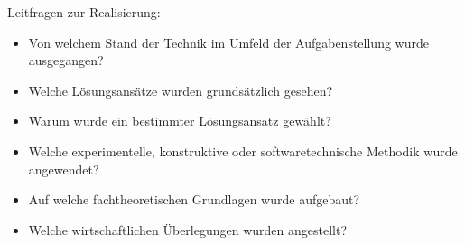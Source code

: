 \renewcommand*{\authorOfNextLines}{HTL Weiz}
Leitfragen zur Realisierung:
\begin{itemize}
	\item Von welchem Stand der Technik im Umfeld der Aufgabenstellung wurde ausgegangen?
	\item Welche Lösungsansätze wurden grundsätzlich gesehen?
	\item Warum wurde ein bestimmter Lösungsansatz gewählt?
	\item Welche experimentelle, konstruktive oder softwaretechnische Methodik wurde angewendet?
	\item Auf welche fachtheoretischen Grundlagen wurde aufgebaut?
	\item Welche wirtschaftlichen Überlegungen wurden angestellt?
\end{itemize}
